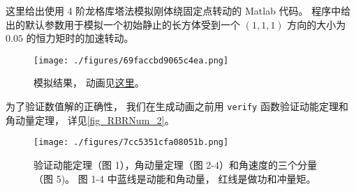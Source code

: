 

这里给出使用 4 阶龙格库塔法模拟刚体绕固定点转动的 Matlab 代码。 程序中给出的默认参数用于模拟一个初始静止的长方体受到一个 $(1,1,1)$ 方向的大小为 $0.05$ 的恒力矩时的加速转动。

\begin{figure}[ht]
\centering
\texttt{[image: ./figures/69faccbd9065c4ea.png]}
\caption{模拟结果， 动画见\href{https://wuli.wiki/apps/rigBdRot.html}{这里}。} \label{fig_RBRNum_1}
\end{figure}

为了验证数值解的正确性， 我们在生成动画之前用 \verb|verify| 函数验证动能定理和角动量定理， 详见\autoref{fig_RBRNum_2}。
\begin{figure}[ht]
\centering
\texttt{[image: ./figures/7cc5351cfa08051b.png]}
\caption{验证动能定理（图 1），角动量定理（图 2-4）和角速度的三个分量（图 5)。 图 1-4 中蓝线是动能和角动量， 红线是做功和冲量矩。} \label{fig_RBRNum_2}
\end{figure}

